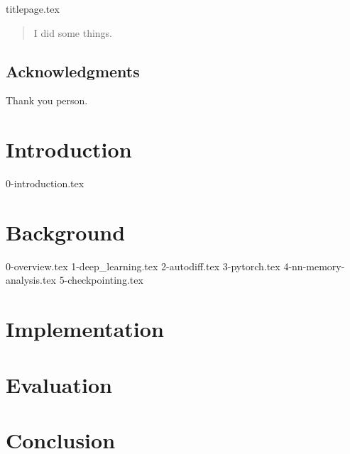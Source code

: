 \documentclass[12pt,twoside]{report}
\begin{document}
{titlepage.tex}

\clearpage{\pagestyle{empty}\cleardoublepage}
\setcounter{page}{1}
\pagestyle{fancy}

\begin{abstract}
I did some things.
\end{abstract}

\cleardoublepage
\section*{Acknowledgments}
Thank you person.

\clearpage{\pagestyle{empty}\cleardoublepage}

\tableofcontents 


\clearpage{\pagestyle{empty}\cleardoublepage}
\setcounter{page}{1}
\fancyhead[LE,RO]{\slshape \rightmark}
\fancyhead[LO,RE]{\slshape \leftmark}

\chapter{Introduction}
{0-introduction.tex}


\chapter{Background}
{0-overview.tex}
{1-deep_learning.tex}
{2-autodiff.tex}
{3-pytorch.tex}
{4-nn-memory-analysis.tex}
{5-checkpointing.tex}


\chapter{Implementation}


\chapter{Evaluation}


\chapter{Conclusion}



\end{document}
